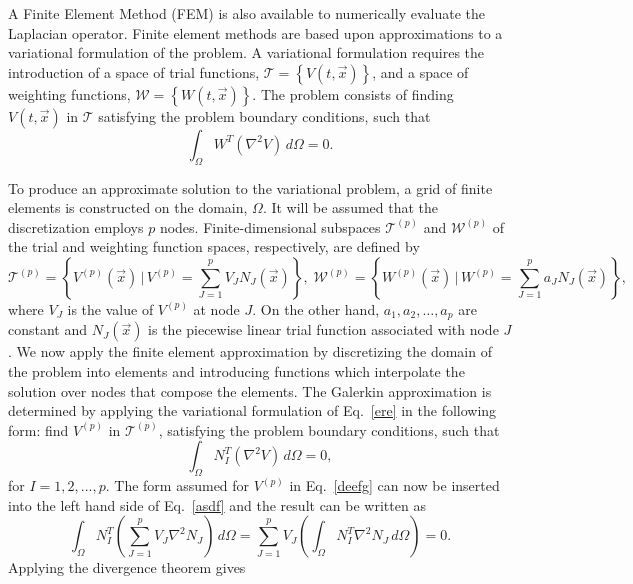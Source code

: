 A Finite Element Method (FEM) is also available to numerically evaluate the Laplacian operator. Finite element methods are based upon approximations to a variational formulation of the problem. A variational formulation requires the introduction of a space of trial functions, $\mathcal{T}=\left\{V(t,\vec x)\right\}$, and a space of weighting functions, $\mathcal{W}=\left\{W(t,\vec x)\right\}$. The problem consists of finding $V(t,\vec x)$ in $\mathcal{T}$ satisfying the problem boundary conditions, such that
\begin{equation} \label{ere}
\int_{\Omega}{W^T\left( \nabla^2 V \right)\,d\Omega}=0.
\end{equation}

To produce an approximate solution to the variational problem, a grid of finite elements is constructed on the domain, $\Omega$. It will be assumed that the discretization employs $p$ nodes. Finite-dimensional subspaces $\mathcal{T}^{(p)}$ and $\mathcal{W}^{(p)}$ of the trial and weighting function spaces, respectively, are defined by
\begin{equation} \label{deefg}
\mathcal{T}^{(p)}=\left\{V^{(p)}(\vec x)\,|\,V^{(p)}=\sum^p_{J=1}{V_J N_J(\vec x)}\right\}, \; \mathcal{W}^{(p)}=\left\{W^{(p)}(\vec x)\,|\,W^{(p)}=\sum^p_{J=1}{a_J N_J(\vec x)}\right\},
\end{equation}
where $V_J$ is the value of $V^{(p)}$ at node $J$. On the other hand, $a_1, a_2, \ldots, a_p$ are constant and $N_J(\vec x)$ is the piecewise linear trial function associated with node $J$. We now apply the finite element approximation by discretizing the domain of the problem into elements and introducing functions which interpolate the solution over nodes that compose the elements. The Galerkin approximation is determined by applying the variational formulation of Eq.~\ref{ere} in the following form: find $V^{(p)}$ in $\mathcal{T}^{(p)}$, satisfying the problem boundary conditions, such that
\begin{equation} \label{asdf}
\int_{\Omega}{N^T_I \left(\nabla^2 V\right) \,d\Omega} = 0,
\end{equation}
for $I=1,2,...,p$. The form assumed for $V^{(p)}$ in Eq.~\ref{deefg} can now be inserted into the left hand side of Eq.~\ref{asdf} and the result can be written as
\begin{equation}
\int_{\Omega}{N^T_I \left(\sum^p_{J=1}V_J \nabla^2 N_J \right) \,d\Omega}=\sum^p_{J=1} V_J \left(\int_{\Omega}{N^T_I \nabla^2 N_J \,d\Omega}\right)=0.
\end{equation}
Applying the divergence theorem gives
